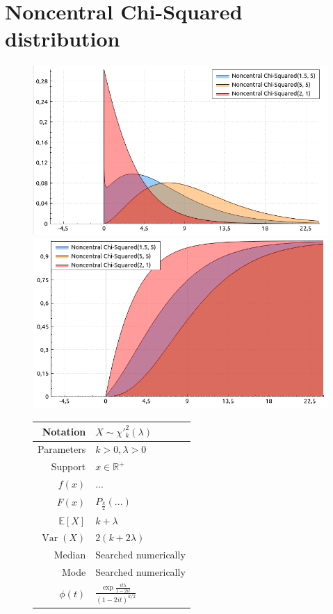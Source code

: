 \documentclass[a4paper,11pt]{article}
\theoremstyle{plain}
\theoremstyle{definition}
\newcommand{\ME}{\mathbb{E}}
\newcommand{\MR}{\mathbb{R}}
\newcommand{\Var}{\operatorname{Var}}
\begin{document}
	\section{Noncentral Chi-Squared distribution}
	\begin{figure}[!htb]\centering
	\begin{minipage}{0.55\textwidth}
		\includegraphics[width=\linewidth, right]{noncentral_chi-squared_pdf}
		\captionsetup{labelformat=empty}
		\includegraphics[width=\linewidth, right]{noncentral_chi-squared_cdf}
		\captionsetup{labelformat=empty}
	\end{minipage}
	\begin{minipage}{0.4\textwidth}
		\begin{tabular}{| r | l |}
			\hline
			Notation & $X \sim \chi'^2_k(\lambda)$ \\
			\hline
			Parameters & $k > 0, \lambda > 0$ \\
			\hline
			Support & $x \in \MR^+$  \\
			\hline
			$f(x)$ & $...  $ \\
			\hline
			$F(x)$ & $P_{\frac{k}{2}}(...) $\\
			\hline
			$\ME[X]$ & $ k + \lambda$ \\
			\hline
			$\Var(X)$ & $2(k+2\lambda)$ \\
			\hline
			Median & Searched numerically \\
			\hline
			Mode & Searched numerically \\
			\hline
			$\phi(t)$ & $ \frac{\exp{\frac{it\lambda}{1-2it}}}{(1-2it)^{k/2}}$ \\
			\hline
		\end{tabular}
	\end{minipage}
    \end{figure}
	
\end{document}
